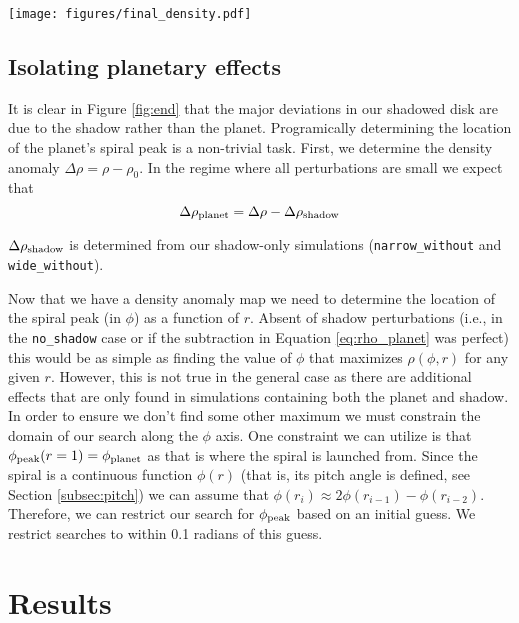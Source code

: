 \documentclass[twocolumn]{aastex631}
\begin{document}
\begin{figure*}
    \texttt{[image: figures/final\_density.pdf]}
    \caption{Final gas density anomaly maps for our five simulations. Note the patterns are dominated by
    the rings created by the shadow. The radial axis is scaled logarithmically.
    }
    \label{fig:end}
\end{figure*}

\subsection{Isolating planetary effects}
It is clear in Figure \ref{fig:end} that the major deviations in our shadowed disk are due to the shadow rather than the planet. Programically determining
the location of the planet's spiral peak is a non-trivial task. First, we determine the density anomaly $\Delta \rho = \rho - \rho_0$. In the regime where all perturbations
are small we expect that
\begin{equation}
    \Delta \rho_{\rm planet} = \Delta \rho - \Delta \rho_{\rm shadow}
    \label{eq:rho_planet}
\end{equation}

$\Delta \rho_{\rm shadow}$ is determined from our shadow-only simulations (\texttt{narrow\_without} and \texttt{wide\_without}). 

Now that we have a density anomaly map we need to determine the location of the spiral peak (in $\phi$) as a function of $r$. Absent of shadow perturbations
(i.e., in the \texttt{no\_shadow} case or if the subtraction in Equation \ref{eq:rho_planet} was perfect) this would be as simple as
finding the value of $\phi$ that maximizes $\rho(\phi,r)$ for any given $r$. However, this is not true in the general case as there are additional
effects that are only found in simulations containing both the planet and shadow. In order to ensure we don't find some other maximum we must constrain
the domain of our search along the $\phi$ axis. One constraint we can utilize is that $\phi_{\rm peak}(r=1) = \phi_{\rm planet}$ as that is where the spiral is
launched from. Since the spiral is a continuous function $\phi(r)$ (that is, its pitch angle is defined, see Section \ref{subsec:pitch}) we can assume that
$\phi(r_i) \approx 2\phi(r_{i-1}) - \phi(r_{i-2})$. Therefore, we can restrict our search for $\phi_{\rm peak}$ based on an initial guess. We restrict searches
to within 0.1 radians of this guess.

\section{Results}
\label{sec:results}
\end{document}
